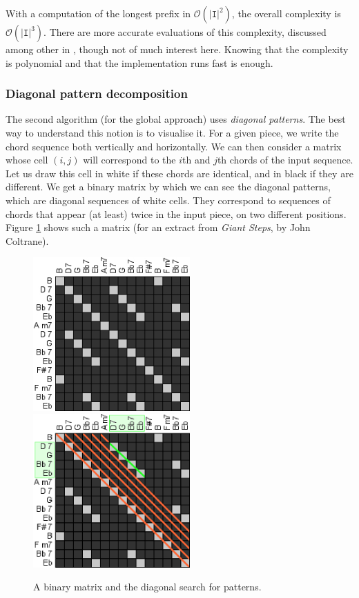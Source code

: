 \documentclass[a4paper,10pt]{article}
\newcommand{\bigO}[1]{\mathcal O\left( #1 \right)}
\begin{document}
With a computation of the longest prefix in $\bigO{|\texttt{I}|^2}$, the overall complexity is $\bigO{|\texttt{I}|^3}$. There are more accurate evaluations of this complexity, discussed among other in \cite{lempelziv}, though not of much interest here. Knowing that the complexity is polynomial and that the implementation runs fast is enough.


\subsubsection{Diagonal pattern decomposition}
\label{compressiondiagonal}

The second algorithm (for the global approach) uses \emph{diagonal patterns}. The best way to understand this notion is to visualise it. For a given piece, we write the chord sequence both vertically and horizontally. We can then consider a matrix whose cell $(i,j)$ will correspond to the $i$th and $j$th chords of the input sequence. Let us draw this cell in white if these chords are identical, and in black if they are different. We get a binary matrix by which we can see the diagonal patterns, which are diagonal sequences of white cells. They correspond to sequences of chords that appear (at least) twice in the input piece, on two different positions. Figure \ref{diagonals} shows such a matrix (for an extract from \emph{Giant Steps}, by John Coltrane).

\begin{figure}[h]
\centering
\includegraphics[width=6cm]{images/diagonals1.jpg}\hspace{1cm}
\includegraphics[width=6cm]{images/diagonals2.jpg}
\caption{A binary matrix and the diagonal search for patterns.\label{diagonals}}
\end{figure}
\end{document}
